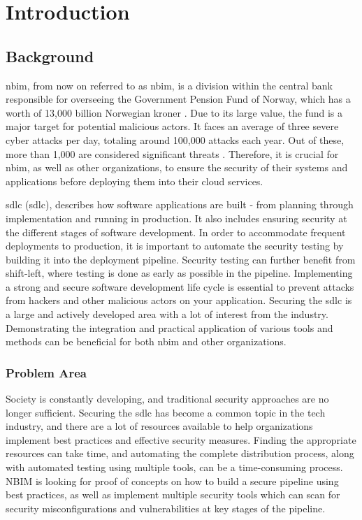 \chapter{Introduction}

\section{Background} %
\acrlong{nbim}, from now on referred to as \acrshort{nbim}, is a division within the central bank responsible for overseeing the Government Pension Fund of Norway, which has a worth of 13,000 billion Norwegian kroner \cite{nbimwebsite}. Due to its large value, the fund is a major target for potential malicious actors. It faces an average of three severe cyber attacks per day, totaling around 100,000 attacks each year. Out of these, more than 1,000 are considered significant threats \cite{nbimattacks}. Therefore, it is crucial for \acrshort{nbim}, as well as other organizations, to ensure the security of their systems and applications before deploying them into their cloud services. 

\acrlong{sdlc} (\acrshort{sdlc}), describes how software applications are built - from planning through implementation and running in production. It also includes ensuring security at the different stages of software development. In order to accommodate frequent deployments to production, it is important to automate the security testing by building it into the deployment pipeline. Security testing can further benefit from shift-left, where testing is done as early as possible in the pipeline. Implementing a strong and secure software development life cycle is essential to prevent attacks from hackers and other malicious actors on your application. Securing the \acrshort{sdlc} is a large and actively developed area with a lot of interest from the industry. Demonstrating the integration and practical application of various tools and methods can be beneficial for both \acrshort{nbim} and other organizations.

\subsection{Problem Area}
Society is constantly developing, and traditional security approaches are no longer sufficient. Securing the \acrlong{sdlc} has become a common topic in the tech industry, and there are a lot of resources available to help organizations implement best practices and effective security measures. Finding the appropriate resources can take time, and automating the complete distribution process, along with automated testing using multiple tools, can be a time-consuming process. NBIM is looking for proof of concepts on how to build a secure pipeline using best practices, as well as implement multiple security tools which can scan for security misconfigurations and vulnerabilities at key stages of the pipeline. 

